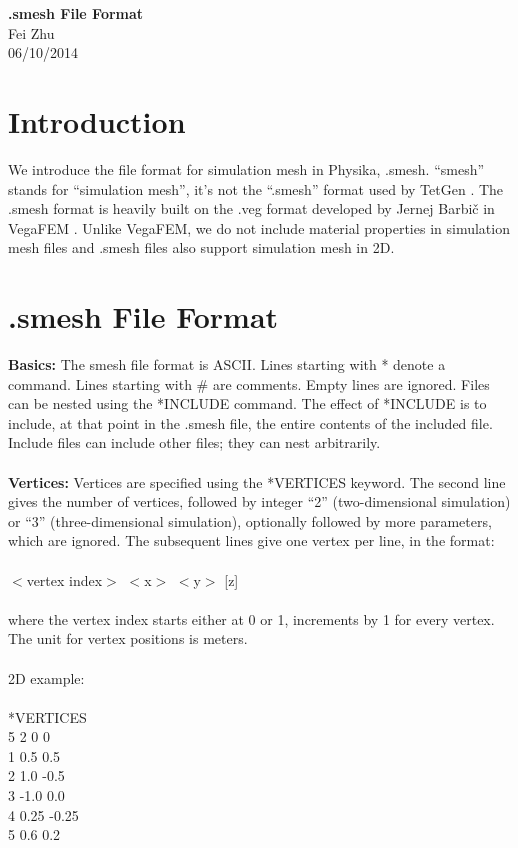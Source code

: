 \documentclass[11pt,fullpage]{article}
\begin{document}
\noindent
\begin{center}
{\bf .smesh File Format}
{\\ Fei Zhu \\ 06/10/2014}
\end{center}

\section{Introduction}

We introduce the file format for simulation mesh in Physika,
.smesh. ``smesh'' stands for ``simulation mesh'', it's not the
``.smesh'' format used by TetGen \cite{si2006}. The .smesh format is
heavily built on the .veg format developed by Jernej Barbi\v{c} in VegaFEM
\cite{vega}. Unlike VegaFEM, we do not include material properties in simulation
mesh files and .smesh files also support simulation mesh in 2D.

\section{.smesh File Format}

\textbf{Basics:} The smesh file format is ASCII. Lines starting with *
denote a command. Lines starting with
\# are comments. Empty lines are ignored. Files can be nested using
the *INCLUDE command. The effect of *INCLUDE is to include, at that
point in the .smesh file, the entire contents of the included
file. Include files can include other files; they can nest
arbitrarily.
\\\\
\noindent{}\textbf{Vertices:} Vertices are specified using the *VERTICES
keyword. The second line gives the number of vertices, followed by
integer ``2'' (two-dimensional simulation) or ``3'' (three-dimensional
simulation), optionally followed by more parameters, which are
ignored. The subsequent lines give one vertex per line, in the format:
\\\\
\noindent{}$<$vertex index$>$ $<$x$>$ $<$y$>$ [z]
\\\\
\noindent{}where the vertex index starts either at 0 or 1, increments by 1 for
every vertex. The unit for vertex positions is meters.
\\\\
\noindent{}2D example:
\\\\
\noindent{}*VERTICES\\
5 2 0 0\\
1 0.5 0.5\\
2 1.0 -0.5\\
3 -1.0 0.0\\
4 0.25 -0.25\\
5 0.6 0.2\\
\end{document}
